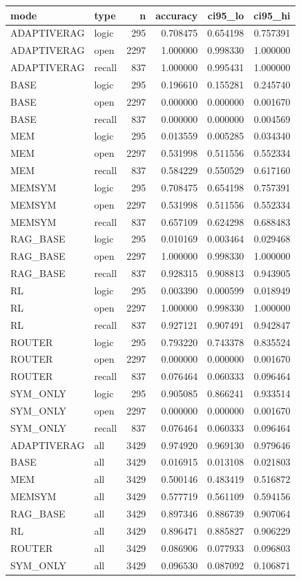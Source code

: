 \begin{tabular}{llrrrr}
\toprule
mode & type & n & accuracy & ci95_lo & ci95_hi \\
\midrule
ADAPTIVERAG & logic & 295 & 0.708475 & 0.654198 & 0.757391 \\
ADAPTIVERAG & open & 2297 & 1.000000 & 0.998330 & 1.000000 \\
ADAPTIVERAG & recall & 837 & 1.000000 & 0.995431 & 1.000000 \\
BASE & logic & 295 & 0.196610 & 0.155281 & 0.245740 \\
BASE & open & 2297 & 0.000000 & 0.000000 & 0.001670 \\
BASE & recall & 837 & 0.000000 & 0.000000 & 0.004569 \\
MEM & logic & 295 & 0.013559 & 0.005285 & 0.034340 \\
MEM & open & 2297 & 0.531998 & 0.511556 & 0.552334 \\
MEM & recall & 837 & 0.584229 & 0.550529 & 0.617160 \\
MEMSYM & logic & 295 & 0.708475 & 0.654198 & 0.757391 \\
MEMSYM & open & 2297 & 0.531998 & 0.511556 & 0.552334 \\
MEMSYM & recall & 837 & 0.657109 & 0.624298 & 0.688483 \\
RAG_BASE & logic & 295 & 0.010169 & 0.003464 & 0.029468 \\
RAG_BASE & open & 2297 & 1.000000 & 0.998330 & 1.000000 \\
RAG_BASE & recall & 837 & 0.928315 & 0.908813 & 0.943905 \\
RL & logic & 295 & 0.003390 & 0.000599 & 0.018949 \\
RL & open & 2297 & 1.000000 & 0.998330 & 1.000000 \\
RL & recall & 837 & 0.927121 & 0.907491 & 0.942847 \\
ROUTER & logic & 295 & 0.793220 & 0.743378 & 0.835524 \\
ROUTER & open & 2297 & 0.000000 & 0.000000 & 0.001670 \\
ROUTER & recall & 837 & 0.076464 & 0.060333 & 0.096464 \\
SYM_ONLY & logic & 295 & 0.905085 & 0.866241 & 0.933514 \\
SYM_ONLY & open & 2297 & 0.000000 & 0.000000 & 0.001670 \\
SYM_ONLY & recall & 837 & 0.076464 & 0.060333 & 0.096464 \\
ADAPTIVERAG & all & 3429 & 0.974920 & 0.969130 & 0.979646 \\
BASE & all & 3429 & 0.016915 & 0.013108 & 0.021803 \\
MEM & all & 3429 & 0.500146 & 0.483419 & 0.516872 \\
MEMSYM & all & 3429 & 0.577719 & 0.561109 & 0.594156 \\
RAG_BASE & all & 3429 & 0.897346 & 0.886739 & 0.907064 \\
RL & all & 3429 & 0.896471 & 0.885827 & 0.906229 \\
ROUTER & all & 3429 & 0.086906 & 0.077933 & 0.096803 \\
SYM_ONLY & all & 3429 & 0.096530 & 0.087092 & 0.106871 \\
\bottomrule
\end{tabular}
